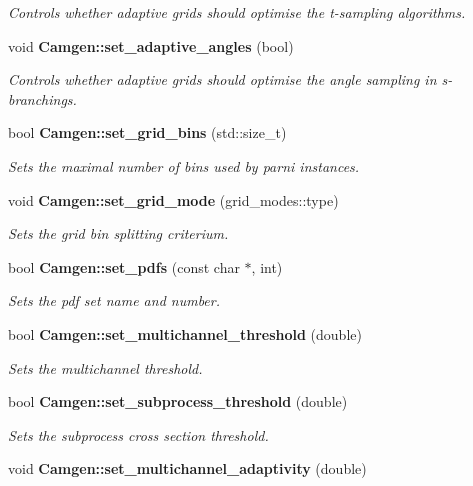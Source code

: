 \begin{DoxyCompactItemize}
\begin{DoxyCompactList}\small\item\em Controls whether adaptive grids should optimise the t-\/sampling algorithms. \end{DoxyCompactList}\item 
void {\bfseries Camgen\-::set\-\_\-adaptive\-\_\-angles} (bool)
\begin{DoxyCompactList}\small\item\em Controls whether adaptive grids should optimise the angle sampling in s-\/branchings. \end{DoxyCompactList}\item 
bool {\bfseries Camgen\-::set\-\_\-grid\-\_\-bins} (std\-::size\-\_\-t)
\begin{DoxyCompactList}\small\item\em Sets the maximal number of bins used by parni instances. \end{DoxyCompactList}\item 
\hypertarget{a00849_aa5ed3db24f82c90ae214ae9fa63e6ec3}{void {\bfseries Camgen\-::set\-\_\-grid\-\_\-mode} (grid\-\_\-modes\-::type)}\label{a00849_aa5ed3db24f82c90ae214ae9fa63e6ec3}

\begin{DoxyCompactList}\small\item\em Sets the grid bin splitting criterium. \end{DoxyCompactList}\item 
bool {\bfseries Camgen\-::set\-\_\-pdfs} (const char $\ast$, int)
\begin{DoxyCompactList}\small\item\em Sets the pdf set name and number. \end{DoxyCompactList}\item 
bool {\bfseries Camgen\-::set\-\_\-multichannel\-\_\-threshold} (double)
\begin{DoxyCompactList}\small\item\em Sets the multichannel threshold. \end{DoxyCompactList}\item 
bool {\bfseries Camgen\-::set\-\_\-subprocess\-\_\-threshold} (double)
\begin{DoxyCompactList}\small\item\em Sets the subprocess cross section threshold. \end{DoxyCompactList}\item 
\hypertarget{a00849_a2a74e7d3f4062e80869473e1c8b6d5ce}{void {\bfseries Camgen\-::set\-\_\-multichannel\-\_\-adaptivity} (double)}\label{a00849_a2a74e7d3f4062e80869473e1c8b6d5ce}


\end{DoxyCompactItemize}
